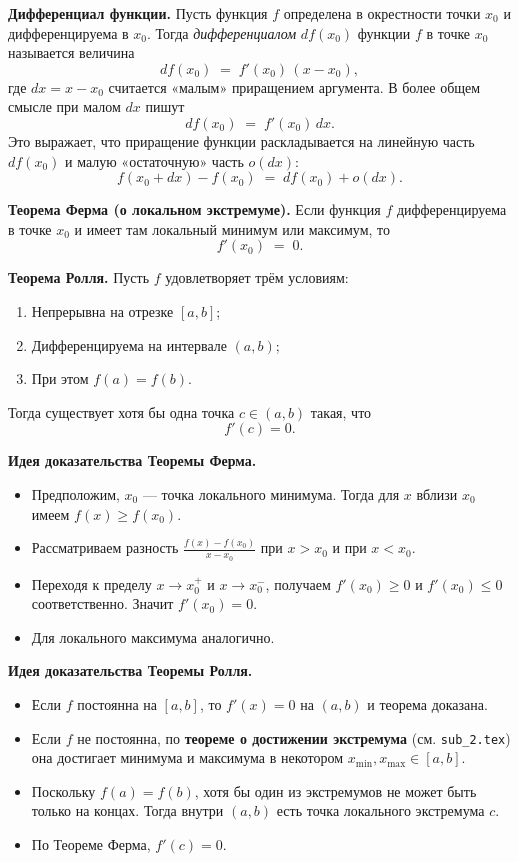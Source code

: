 

\textbf{Дифференциал функции.}
Пусть функция $f$ определена в окрестности точки $x_0$ и дифференцируема в $x_0$. Тогда \emph{дифференциалом} $df(x_0)$ функции $f$ в точке $x_0$ называется величина
\[
df(x_0) \;=\; f'(x_0)\,(x - x_0),
\]
где $dx = x - x_0$ считается «малым» приращением аргумента. В более общем смысле при малом $dx$ пишут
\[
df(x_0) \;=\; f'(x_0)\,dx.
\]
Это выражает, что приращение функции раскладывается на линейную часть $df(x_0)$ и малую «остаточную» часть $o(dx)$:
\[
f(x_0 + dx) - f(x_0) \;=\; df(x_0) + o(dx).
\]

\medskip


\textbf{Теорема Ферма (о локальном экстремуме).}
Если функция $f$ дифференцируема в точке $x_0$ и имеет там локальный минимум или максимум, то
\[
f'(x_0) \;=\; 0.
\]

\textbf{Теорема Ролля.}
Пусть $f$ удовлетворяет трём условиям:
\begin{enumerate}
  \item Непрерывна на отрезке $[a,b]$;
  \item Дифференцируема на интервале $(a,b)$;
  \item При этом $f(a) = f(b)$.
\end{enumerate}
Тогда существует хотя бы одна точка $c \in (a,b)$ такая, что
\[
f'(c) = 0.
\]

\medskip


\textbf{Идея доказательства Теоремы Ферма.}
\begin{itemize}
  \item Предположим, $x_0$ — точка локального минимума. Тогда для $x$ вблизи $x_0$ имеем $f(x)\ge f(x_0)$.  
  \item Рассматриваем разность $\frac{f(x)-f(x_0)}{x - x_0}$ при $x > x_0$ и при $x < x_0$.  
  \item Переходя к пределу $x\to x_0^+$ и $x\to x_0^-$, получаем $f'(x_0)\ge0$ и $f'(x_0)\le0$ соответственно. Значит $f'(x_0)=0$.  
  \item Для локального максимума аналогично.
\end{itemize}

\textbf{Идея доказательства Теоремы Ролля.}
\begin{itemize}
  \item Если $f$ постоянна на $[a,b]$, то $f'(x)=0$ на $(a,b)$ и теорема доказана.  
  \item Если $f$ не постоянна, по \textbf{теореме о достижении экстремума} (см. \texttt{sub\_2.tex}) она достигает минимума и максимума в некотором $x_{\min}, x_{\max}\in[a,b]$.  
  \item Поскольку $f(a)=f(b)$, хотя бы один из экстремумов не может быть только на концах. Тогда внутри $(a,b)$ есть точка локального экстремума $c$.  
  \item По Теореме Ферма, $f'(c)=0$.
\end{itemize}

